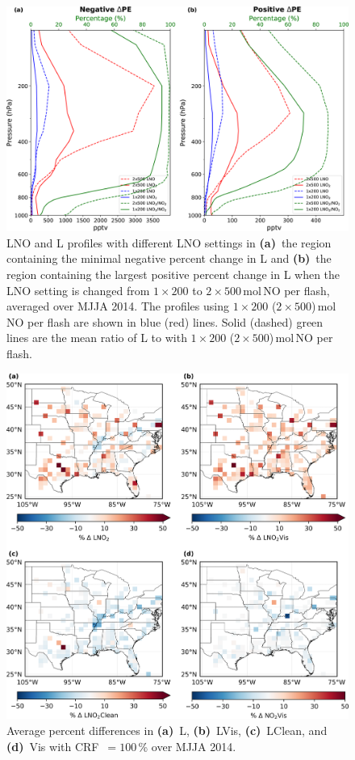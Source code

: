 \documentclass[amt]{copernicus}
\begin{document}
\begin{figure}[t]
    \includegraphics[width=13cm]{amt-2019-372-f11.png}
    \caption{LNO and L profiles with different LNO settings in \textbf{(a)}~the region containing the minimal negative percent change in L and \textbf{(b)}~the region containing the largest positive percent change in L when the LNO setting is changed from $1\times200$ to $2\times500$\,mol\,NO per flash, averaged over MJJA 2014.
    The profiles using $1\times200$ ($2\times500$)\,mol\,NO per flash are shown in blue (red) lines.
    Solid (dashed) green lines are the mean ratio of L to  with $1\times200$ ($2\times500$)\,mol\,NO per flash.}
    \label{fig:distribution}
\end{figure}

\begin{figure}[t]
    \includegraphics[width=12cm]{amt-2019-372-f12.png}
    \caption{Average percent differences in \textbf{(a)}~L, \textbf{(b)}~LVis, \textbf{(c)}~LClean, and \textbf{(d)}~Vis with CRF~$= 100$\,{\%} over MJJA 2014.}
    \label{fig:diff_crf100}
\end{figure}
\end{document}
